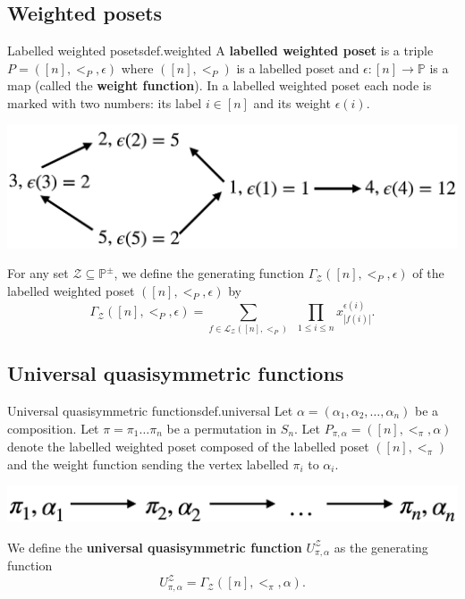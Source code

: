 \documentclass[numbers=enddot,12pt,final,onecolumn,notitlepage]{scrartcl}%
\newcommand{\PP}{\mathbb{P}} %
\newcommand{\0}{\phantom{c}}
\let\sumnonlimits\sum
\let\prodnonlimits\prod
\renewcommand{\sum}{\sumnonlimits\limits}
\renewcommand{\prod}{\prodnonlimits\limits}
\begin{document}
\subsection{Weighted posets}
\begin{definition}{Labelled weighted posets}{def.weighted}
A \textbf{labelled weighted poset} is a triple $P = ([n], <_P, \epsilon)$ where $([n], <_P)$ is a labelled poset and $\epsilon : [n] \longrightarrow \PP$ is a map (called the \textbf{weight function}).
In a labelled weighted poset each node is marked with two numbers: its label $i \in [n]$ and its weight $\epsilon(i)$.
%
\begin{center}
 \includegraphics[scale=0.16]{Poset.png}
 \label{fig : poset}
 \end{center}
 For any set $\mathcal{Z}\subseteq \PP^{\pm}$, we define the generating function $\Gamma_\mathcal{Z}([n], <_P, \epsilon)$ of the labelled weighted poset $([n], <_P, \epsilon)$ by
\begin{equation}
\label{eq : weightGamma}
\Gamma_\mathcal{Z}([n], <_P, \epsilon) = \sum_{f \in \mathcal{L}_\mathcal{Z}([n], <_P)}\ \ \prod_{1\leq i \leq n}x^{\epsilon(i)}_{|f(i)|} .
\end{equation} 
 \end{definition}
 
\subsection{Universal quasisymmetric functions}
\begin{definition}{Universal quasisymmetric functions}{def.universal}
Let $\alpha = (\alpha_1, \alpha_2, \ldots, \alpha_n)$ be a composition.
Let $\pi=\pi_1\dots\pi_n$ be a permutation in $S_n$.
Let $P_{\pi,\alpha} = ([n],<_\pi,\alpha)$ denote the labelled weighted poset composed of the labelled poset $([n], <_\pi)$ and the weight function sending the vertex labelled $\pi_i$ to $\alpha_i$.
\begin{center}
\includegraphics[scale=0.20]{PosetMonomial.pdf}
 \label{fig : monomial}
 \end{center}
We define the \textbf{universal quasisymmetric function} $U^\mathcal{Z}_{\pi,\alpha}$ as the generating function
\begin{equation}
U^\mathcal{Z}_{\pi,\alpha} = \Gamma_\mathcal{Z}([n],<_\pi, \alpha).
\end{equation}
\end{definition}
\end{document}
